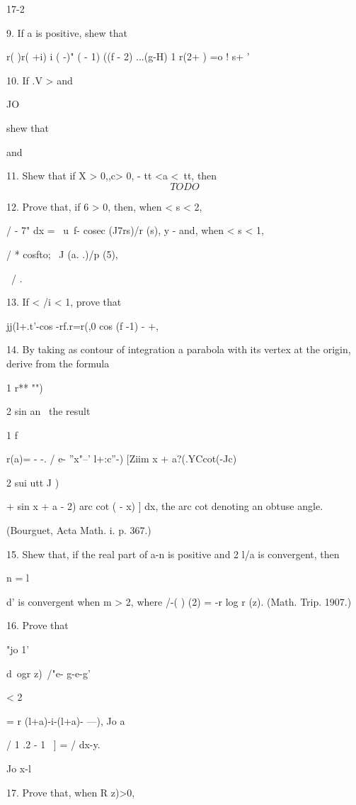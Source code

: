 17-2

%
%

9. If a is positive, shew that

r( )r( +i) i ( -)" ( - 1) ((f - 2) ...(g-H) 1 r(2+ ) =o ! s+ '

10. If .V > and

JO

shew that

and

11. Shew that if X > 0,,c> 0, - tt <a <\ tt, then
$$
TODO
$$

12. Prove that, if 6 > 0, then, when < s < 2,

/ - 7" dx = \ u\ f- cosec (J7rs)/r (s), y - and, when < s < 1,

/ * cosfto; \ J (a. .)/p (5), 

\ / .

13. If < /i < 1, prove that

jj(l+.t'-cos -rf.r=r(,0 cos (f -1) - +,


14. By taking as contour of integration a parabola with its vertex at
the origin, derive from the formula

1 r** "")

2 sin an \ the result

1 f

r(a)= - -. / e- ''x"--' l+:c''-) [Ziim x + a?(.YCcot(-Jc)

2 sui utt J )

+ sin x + a - 2) arc cot ( - x) ] dx, the arc cot denoting an obtuse
angle.

(Bourguet, Acta Math. i. p. 367.)

15. Shew that, if the real part of a-n is positive and 2 l/a is
convergent, then

n = l

d' is convergent when m > 2, where \//-( ) (2) = -r log r (z). (Math.
Trip. 1907.)

16. Prove that

"jo 1'

d\ ogr z)\ /"e- g-e-g'

< 2

= r (l+a)-i-(l+a)- ---), Jo a

/ 1 .2 - 1 \ ] = / dx-y. 

Jo x-l

%
%

17. Prove that, when R z)>0,

